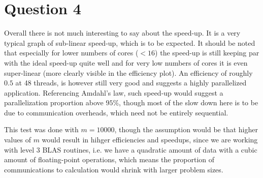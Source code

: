 \documentclass{scrartcl}
\begin{document}
\section{Question 4}

Overall there is not much interesting to say about the speed-up. 
It is a very typical graph of sub-linear speed-up, which is to be expected.
It should be noted that especially for lower numbers of cores ($<16$) the speed-up is still keeping par with the ideal speed-up quite well and for very low numbers of cores it is even super-linear (more clearly visible in the efficiency plot).
An efficiency of roughly $0.5$ at 48 threads, is however still very good and suggests a highly parallelized application.
Referencing Amdahl's law, such speed-up would suggest a parallelization proportion above $95\%$, though most of the slow down here is to be due to communication overheads, which need not be entirely sequential.

This test was done with $m=10000$, though the assumption would be that higher values of $m$ would result in hihger efficiencies and speedups, since we are working with level 3 BLAS routines, i.e. we have a quadratic amount of data with a cubic amount of floating-point operations, which means the proportion of communications to calculation would shrink with larger problem sizes.
\end{document}
